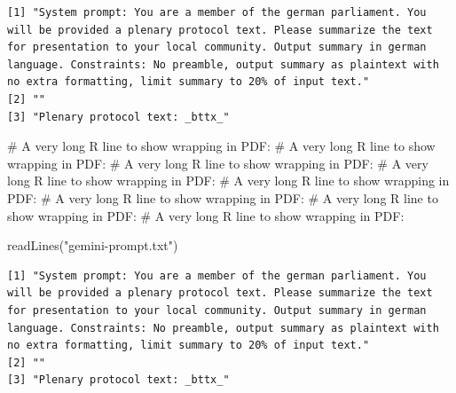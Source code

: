 \documentclass[
  letterpaper,
  DIV=11,
  numbers=noendperiod]{scrartcl}
\newenvironment{Shaded}{\begin{snugshade}}{\end{snugshade}}
\newcommand{\CommentTok}[1]{\textcolor[rgb]{0.37,0.37,0.37}{#1}}
\newcommand{\FunctionTok}[1]{\textcolor[rgb]{0.28,0.35,0.67}{#1}}
\newcommand{\NormalTok}[1]{\textcolor[rgb]{0.00,0.23,0.31}{#1}}
\newcommand{\StringTok}[1]{\textcolor[rgb]{0.13,0.47,0.30}{#1}}
\begin{document}
\begin{verbatim}
[1] "System prompt: You are a member of the german parliament. You will be provided a plenary protocol text. Please summarize the text for presentation to your local community. Output summary in german language. Constraints: No preamble, output summary as plaintext with no extra formatting, limit summary to 20% of input text."
[2] ""                                                                                                                                                                                                                                                                                                                                  
[3] "Plenary protocol text: _bttx_"                                                                                                                                                                                                                                                                                                     
\end{verbatim}

\begin{Shaded}
\begin{Highlighting}[]
\CommentTok{\# A very long R line to show wrapping in PDF: \# A very long R line to show wrapping in PDF: \# A very long R line to show wrapping in PDF: \# A very long R line to show wrapping in PDF: \# A very long R line to show wrapping in PDF: \# A very long R line to show wrapping in PDF: \# A very long R line to show wrapping in PDF: \# A very long R line to show wrapping in PDF:}



\FunctionTok{readLines}\NormalTok{(}\StringTok{"gemini{-}prompt.txt"}\NormalTok{)}
\end{Highlighting}
\end{Shaded}

\begin{verbatim}
[1] "System prompt: You are a member of the german parliament. You will be provided a plenary protocol text. Please summarize the text for presentation to your local community. Output summary in german language. Constraints: No preamble, output summary as plaintext with no extra formatting, limit summary to 20% of input text."
[2] ""                                                                                                                                                                                                                                                                                                                                  
[3] "Plenary protocol text: _bttx_"                                                                                                                                                                                                                                                                                                     
\end{verbatim}
\end{document}
